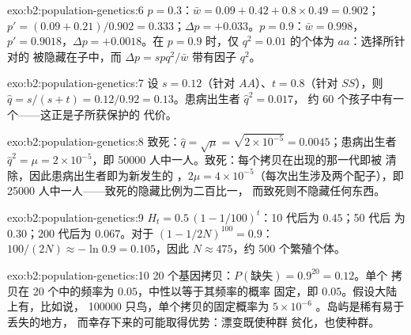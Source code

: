 \begin{solution}{exo:b2:population-genetics:6}
$p = 0.3$：$\bar w = 0.09 + 0.42 + 0.8\times 0.49 = 0.902$；$p' =
(0.09 + 0.21)/0.902 = 0.333$；$\Delta p = +0.033$。$p = 0.9$：$\bar w
= 0.998$，$p' = 0.9018$，$\Delta p = +0.0018$。在 $p = 0.9$ 时，仅
$q^{2} = 0.01$ 的个体为 $aa$：选择所针对的
被隐藏在子中，而 $\Delta p = spq^{2}/\bar w$
带有因子 $q^{2}$。
\end{solution}

\begin{solution}{exo:b2:population-genetics:7}
设 $s = 0.12$（针对 $AA$）、$t = 0.8$（针对 $SS$），则 $\hat q =
s/(s + t) = 0.12/0.92 = 0.13$。患病出生者 $\hat q^{2} = 0.017$，
约 60 个孩子中有一个——这正是子所获保护的
代价。
\end{solution}

\begin{solution}{exo:b2:population-genetics:8}
致死：$\hat q = \sqrt{\mu} = \sqrt{2\times 10^{-5}} =
0.0045$；患病出生者 $\hat q^{2} = \mu = 2\times 10^{-5}$，即
\num{50000} 人中一人。致死：每个拷贝在出现的那一代即被
清除，因此患病出生者即为新发生的
，$2\mu = 4\times 10^{-5}$（每次出生涉及两个配子），即
\num{25000} 人中一人——致死的隐藏比例为二百比一，
而致死则不隐藏任何东西。
\end{solution}

\begin{solution}{exo:b2:population-genetics:9}
$H_t = 0.5\,(1 - 1/100)^{t}$：10 代后为 $0.45$；50 代后
为 $0.30$；200 代后为 $0.067$。对于 $(1 - 1/2N)^{100} = 0.9$：
$100/(2N) \approx -\ln 0.9 = 0.105$，因此 $N \approx 475$，约 500
个繁殖个体。
\end{solution}

\begin{solution}{exo:b2:population-genetics:10}
20 个基因拷贝：$P(\text{缺失}) = 0.9^{20} = 0.12$。单个
拷贝在 20 个中的频率为 $0.05$，中性以等于其频率的概率
固定，即 $0.05$。假设大陆上有，比如说，
\num{100000} 只鸟，单个拷贝的固定概率为 $5\times 10^{-6}$
。岛屿是稀有易于丢失的地方，
而幸存下来的可能取得优势：漂变既使种群
贫化，也使种群。
\end{solution}

